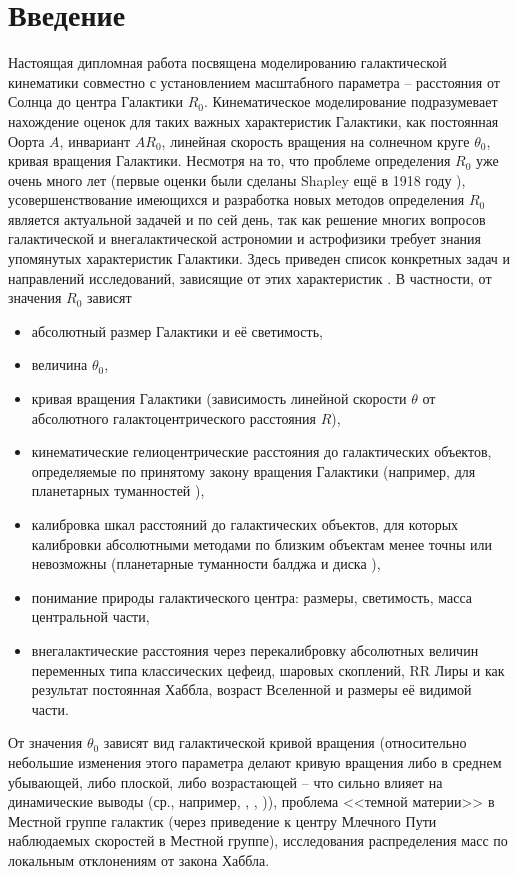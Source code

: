 \documentclass{matmex-diploma-custom}
\begin{document}
\section*{Введение}
Настоящая дипломная работа посвящена моделированию галактической кинематики совместно с установлением масштабного параметра -- расстояния от Солнца до центра Галактики $R_0$. Кинематическое моделирование подразумевает нахождение оценок для таких важных характеристик Галактики, как постоянная Оорта $A$, инвариант $AR_0$, линейная скорость вращения на солнечном круге $\theta_0$, кривая вращения Галактики. Несмотря на то, что проблеме определения $R_0$ уже очень много лет (первые оценки были сделаны Shapley ещё в 1918 году \cite{Shapley}), усовершенствование имеющихся и разработка новых методов определения $R_0$ является актуальной задачей и по сей день, так как решение многих вопросов галактической и внегалактической астрономии и астрофизики требует знания упомянутых характеристик Галактики. Здесь приведен список конкретных задач и направлений исследований, зависящие от этих характеристик \cite{NII}. В частности, от значения $R_0$ зависят 
\begin{itemize}
        \item абсолютный размер Галактики и её светимость,
        \item величина $\theta_0$,
        \item кривая вращения Галактики (зависимость линейной скорости $\theta$ от абсолютного галактоцентрического расстояния $R$),
        \item кинематические гелиоцентрические расстояния до галактических объектов, определяемые по принятому закону вращения Галактики (например, для планетарных туманностей \cite{Acker}),
        \item калибровка шкал расстояний до галактических объектов, для которых калибровки абсолютными методами по близким объектам менее точны или невозможны (планетарные туманности балджа \cite{Steene} и диска \cite{NIIBob}),
        \item понимание природы галактического центра: размеры, светимость, масса центральной части,
        \item внегалактические расстояния через перекалибровку абсолютных величин переменных типа классических цефеид, шаровых скоплений, RR Лиры и как результат постоянная Хаббла, возраст Вселенной и размеры её видимой части. 
\end{itemize}
\par От значения $\theta_0$ зависят вид галактической кривой вращения (относительно небольшие изменения этого параметра делают кривую вращения либо в среднем убывающей, либо плоской, либо возрастающей -- что сильно влияет на динамические выводы (ср., например, \cite{Chini}, \cite{Lepine}, \cite{Merrifield})), проблема <<темной материи>> в Местной группе галактик (через приведение к центру Млечного Пути наблюдаемых скоростей в Местной группе), исследования распределения масс по локальным отклонениям от закона Хаббла.
\end{document}
